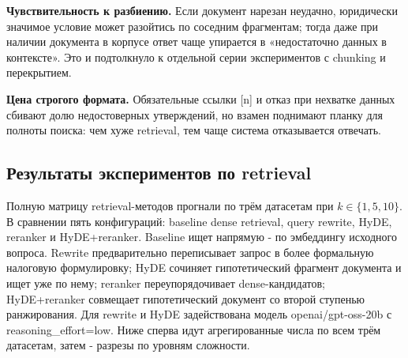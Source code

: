 \documentclass[a4paper,12pt]{article}
\begin{document}
\textbf{Чувствительность к разбиению.} Если документ нарезан неудачно, юридически значимое условие может разойтись по соседним фрагментам; тогда даже при наличии документа в корпусе ответ чаще упирается в «недостаточно данных в контексте». Это и подтолкнуло к отдельной серии экспериментов с chunking и перекрытием.

\textbf{Цена строгого формата.} Обязательные ссылки [n] и отказ при нехватке данных сбивают долю недостоверных утверждений, но взамен поднимают планку для полноты поиска: чем хуже retrieval, тем чаще система отказывается отвечать.

\subsection{Результаты экспериментов по retrieval}

Полную матрицу retrieval-методов прогнали по трём датасетам при $k \in \{1,5,10\}$. В сравнении пять конфигураций: baseline dense retrieval, query rewrite, HyDE, reranker и HyDE+reranker. Baseline ищет напрямую - по эмбеддингу исходного вопроса. Rewrite предварительно переписывает запрос в более формальную налоговую формулировку; HyDE сочиняет гипотетический фрагмент документа и ищет уже по нему; reranker переупорядочивает dense-кандидатов; HyDE+reranker совмещает гипотетический документ со второй ступенью ранжирования. Для rewrite и HyDE задействована модель openai/gpt-oss-20b с reasoning\_effort=low. Ниже сперва идут агрегированные числа по всем трём датасетам, затем - разрезы по уровням сложности.
\end{document}

